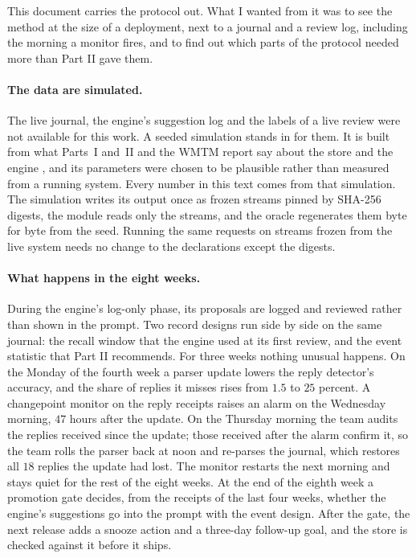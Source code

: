 \documentclass[11pt]{article}
\theoremstyle{definition}
\theoremstyle{plain}
\begin{document}
This document carries the protocol out. What I wanted from it was to see the method at the size of
a deployment, next to a journal and a review log, including the morning a monitor fires, and to
find out which parts of the protocol needed more than Part II gave them.

\paragraph{The data are simulated.} The live journal, the engine's suggestion log and the labels of
a live review were not available for this work. A seeded simulation stands in for them. It is built
from what Parts~I and~II and the WMTM report say about the store and the engine \cite{wmtm}, and
its parameters were chosen to be plausible rather than measured from a running system. Every
number in this text comes from that simulation. The simulation writes its output once as frozen
streams pinned by SHA-256 digests, the module reads only the streams, and the oracle regenerates
them byte for byte from the seed. Running the same requests on streams frozen from the live system
needs no change to the declarations except the digests.

\paragraph{What happens in the eight weeks.} During the engine's log-only phase, its proposals are
logged and reviewed rather than shown in the prompt. Two record designs run side by side on the
same journal: the recall window that the engine used at its first review, and the event statistic
that Part II recommends. For three weeks nothing unusual happens. On the Monday of the fourth week a
parser update lowers the reply detector's accuracy, and the share of replies it misses rises from
$1.5$ to $25$ percent. A changepoint monitor on the reply receipts raises an alarm on the Wednesday
morning, $47$ hours after the update. On the Thursday morning the team audits the replies received
since the update; those received after the alarm confirm it, so the team rolls the parser back at
noon and re-parses the journal, which restores all $18$ replies the update had lost. The monitor
restarts the next morning and stays quiet for the rest of the eight weeks. At the end of the eighth
week a promotion gate decides, from the receipts of the last four weeks, whether the engine's
suggestions go into the prompt with the event design. After the gate, the next release adds a
snooze action and a three-day follow-up goal, and the store is checked against it before it
ships.
\end{document}
